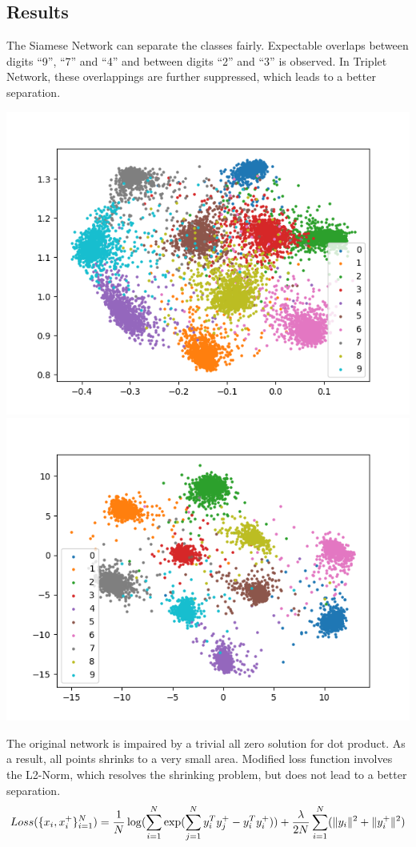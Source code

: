 \documentclass[a0,portrait]{a0poster}
\begin{document}
\begin{multicols}{2}
		\section*{Results}
		The Siamese Network can separate the classes fairly. Expectable overlaps between digits ``9'', ``7'' and ``4'' and between digits ``2'' and ``3'' is observed. In Triplet Network, these overlappings are further suppressed, which leads to a better separation.
		\begin{center}\vspace{1cm}
			\includegraphics[width=0.45\linewidth]{../report_shaoheng/siamese}
			\includegraphics[width=0.45\linewidth]{../report_shaoheng/triplet}
		\end{center}\vspace{1cm}
		
		The original network is impaired by a trivial all zero solution for dot product. As a result, all points shrinks to a very small area. Modified loss function involves the L2-Norm, which resolves the shrinking problem, but does not lead to a better separation.
		\begin{equation}
		Loss(\{x_i,x_i^+\}^N_{i=1})\notag
		=\frac{1}{N}\log(\sum_{i=1}^N\exp(\sum_{j=1}^Ny^T_iy_j^+-y_i^Ty_i^+))+ \frac{\lambda}{2N} \sum_{i=1}^N(\lVert y_i\rVert^2+ \lVert y^+_i\rVert^2)
		\end{equation}
		

\end{multicols}
\end{document}
